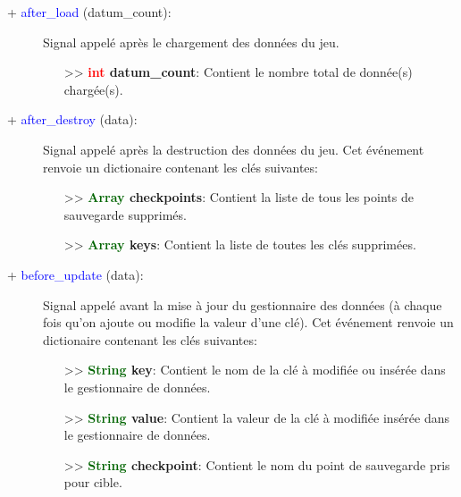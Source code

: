 \documentclass[a4paper, 11pt]{article}
\begin{document}
	\begin{description}
		\item [+ \textcolor{blue}{after\_load} (datum\_count):] Signal appelé après le chargement des
		données du jeu.
		\begin{itemize}
			\item [>> \textbf{\textcolor{red}{int} datum\_count}:] Contient le nombre total de donnée(s)
			chargée(s).\\
		\end{itemize}
	\end{description}
	\begin{description}
		\item [+ \textcolor{blue}{after\_destroy} (data):] Signal appelé après la destruction des données du
		jeu. Cet événement renvoie un dictionaire contenant les clés suivantes:
		\begin{itemize}
			\item [>> \textbf{\textcolor{darkgreen}{Array} checkpoints}:] Contient la liste de tous les
			points de sauvegarde supprimés.
			\item [>> \textbf{\textcolor{darkgreen}{Array} keys}:] Contient la liste de toutes les clés
			supprimées.\\
		\end{itemize}
	\end{description}
	\begin{description}
		\item [+ \textcolor{blue}{before\_update} (data):] Signal appelé avant la mise à jour du
		gestionnaire des données (à chaque fois qu'on ajoute ou modifie la valeur d'une clé). Cet événement
		renvoie un dictionaire contenant les clés suivantes:
		\begin{itemize}
			\item [>> \textbf{\textcolor{darkgreen}{String} key}:] Contient le nom de la clé à modifiée ou
			insérée dans le gestionnaire de données.
			\item [>> \textbf{\textcolor{darkgreen}{String} value}:] Contient la valeur de la clé à modifiée
			insérée dans le gestionnaire de données.
			\item [>> \textbf{\textcolor{darkgreen}{String} checkpoint}:] Contient le nom du point de
			sauvegarde pris pour cible.\\
		\end{itemize}
	\end{description}
\end{document}
